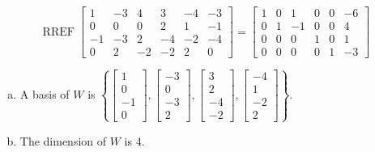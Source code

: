 \begin{exerciseAnswer} 


\[\operatorname{RREF} \left[\begin{array}{cccccc}
1 & -3 & 4 & 3 & -4 & -3 \\
0 & 0 & 0 & 2 & 1 & -1 \\
-1 & -3 & 2 & -4 & -2 & -4 \\
0 & 2 & -2 & -2 & 2 & 0
\end{array}\right] = \left[\begin{array}{cccccc}
1 & 0 & 1 & 0 & 0 & -6 \\
0 & 1 & -1 & 0 & 0 & 4 \\
0 & 0 & 0 & 1 & 0 & 1 \\
0 & 0 & 0 & 0 & 1 & -3
\end{array}\right] \]


\begin{enumerate}[(a)]
\item A basis of \(W\) is \( \left\{ \left[\begin{array}{c}
1 \\
0 \\
-1 \\
0
\end{array}\right] , \left[\begin{array}{c}
-3 \\
0 \\
-3 \\
2
\end{array}\right] , \left[\begin{array}{c}
3 \\
2 \\
-4 \\
-2
\end{array}\right] , \left[\begin{array}{c}
-4 \\
1 \\
-2 \\
2
\end{array}\right] \right\} \).
\item The dimension of \(W\) is \( 4 \).
\end{enumerate}
    
\end{exerciseAnswer}
    
